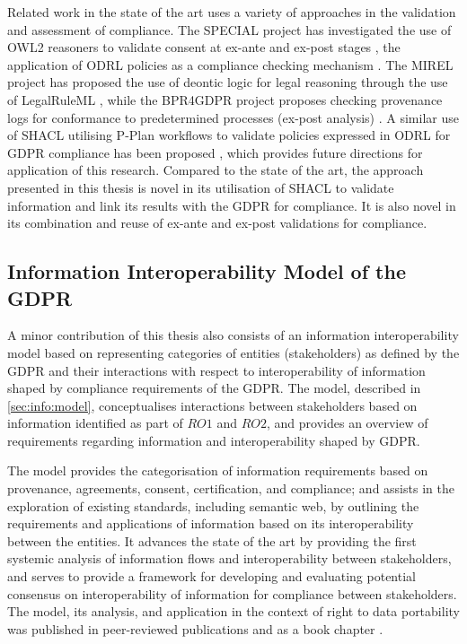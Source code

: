 Related work in the state of the art uses a variety of approaches in the validation and assessment of compliance. The SPECIAL project has investigated the use of OWL2 reasoners to validate consent at ex-ante and ex-post stages \cite{bonatti_fast_2018,dullaert_d3.4_2019}, the application of ODRL policies as a compliance checking mechanism \cite{agarwal_legislative_2018,vos_odrl_2019}. The MIREL project has proposed the use of deontic logic for legal reasoning through the use of LegalRuleML \cite{palmirani_pronto_2018,monica_modelling_2018}, while the BPR4GDPR project proposes checking provenance logs for conformance to predetermined processes (ex-post analysis) \cite{mehr_compliance_2019}.
A similar use of SHACL utilising P-Plan workflows to validate policies expressed in ODRL for GDPR compliance has been proposed \cite{lieber_policy-compliant_2019}, which provides future directions for application of this research.
Compared to the state of the art, the approach presented in this thesis is novel in its utilisation of SHACL to validate information and link its results with the GDPR for compliance. It is also novel in its combination and reuse of ex-ante and ex-post validations for compliance.

\subsection{Information Interoperability Model of the GDPR}
A minor contribution of this thesis also consists of an information interoperability model based on representing categories of entities (stakeholders) as defined by the GDPR and their interactions with respect to interoperability of information shaped by compliance requirements of the GDPR.
The model, described in \autoref{sec:info:model}, conceptualises interactions between stakeholders based on information identified as part of $RO1$ and $RO2$, and provides an overview of requirements regarding information and interoperability shaped by GDPR.

The model provides the categorisation of information requirements based on provenance, agreements, consent, certification, and compliance; and assists in the exploration of existing standards, including semantic web, by outlining the requirements and applications of information based on its interoperability between the entities.
It advances the state of the art by providing the first systemic analysis of information flows and interoperability between stakeholders, and serves to provide a framework for developing and evaluating potential consensus on interoperability of information for compliance between stakeholders.
The model, its analysis, and application in the context of right to data portability was published in peer-reviewed publications \cite{pandit_modelling_2017,pandit_exploration_2018} and as a book chapter \cite{pandit_standardisation_2020}.


